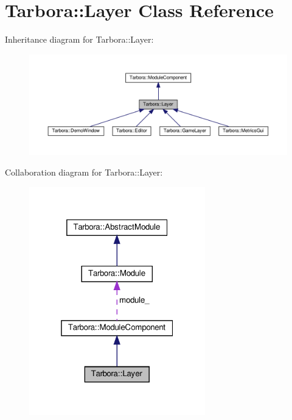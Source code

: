 \hypertarget{classTarbora_1_1Layer}{}\section{Tarbora\+:\+:Layer Class Reference}
\label{classTarbora_1_1Layer}


Inheritance diagram for Tarbora\+:\+:Layer\+:\nopagebreak
\begin{figure}[H]
\begin{center}
\leavevmode
\includegraphics[width=350pt]{classTarbora_1_1Layer__inherit__graph}
\end{center}
\end{figure}


Collaboration diagram for Tarbora\+:\+:Layer\+:\nopagebreak
\begin{figure}[H]
\begin{center}
\leavevmode
\includegraphics[width=217pt]{classTarbora_1_1Layer__coll__graph}
\end{center}
\end{figure}
